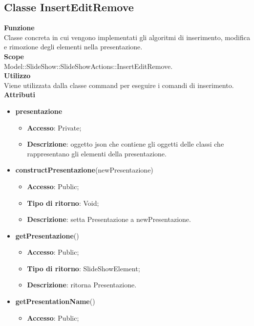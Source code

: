 \subsection{Classe InsertEditRemove}{
		\textbf{Funzione}\\
			\indent Classe concreta in cui vengono implementati gli algoritmi di inserimento, modifica e rimozione degli elementi nella presentazione.\\
	   	\textbf{Scope}\\
			\indent Model::SlideShow::SlideShowActions::InsertEditRemove.\\
		\textbf{Utilizzo}\\
			\indent Viene utilizzata dalla classe command per eseguire i comandi di inserimento.\\
		\textbf{Attributi}
		\begin{itemize}
			\item \textbf{presentazione}
			\begin{itemize}
				\item \textbf{Accesso}: Private;
				\item \textbf{Descrizione}: oggetto json che contiene gli oggetti delle classi che rappresentano gli elementi della presentazione.
			\end{itemize}
		\end{itemize}
		\begin{itemize}
			\item \textbf{constructPresentazione}(newPresentazione)
			\begin{itemize}
				\item \textbf{Accesso}: Public;
				\item \textbf{Tipo di ritorno}: Void;
				\item \textbf{Descrizione}: setta Presentazione a newPresentazione.
			\end{itemize}
			\item \textbf{getPresentazione}()
			\begin{itemize}
				\item \textbf{Accesso}: Public;
				\item \textbf{Tipo di ritorno}: SlideShowElement;
				\item \textbf{Descrizione}: ritorna Presentazione.
			\end{itemize}
			\item \textbf{getPresentationName}()
			\begin{itemize}
				\item \textbf{Accesso}: Public;

\end{itemize}
\end{itemize}}
